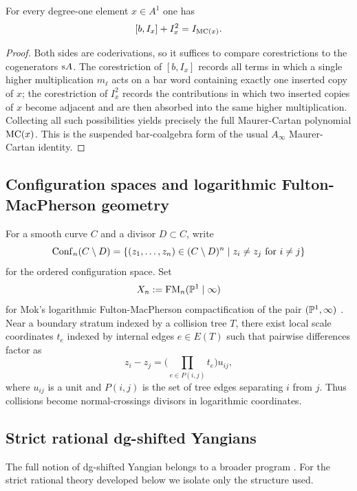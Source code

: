 \begin{lemma}%
For every degree-one element $x\in A^1$ one has
\[
 [b,I_x]+I_x^2 = I_{\mathrm{MC}(x)}.
\]
\end{lemma}

\begin{proof}
Both sides are coderivations, so it suffices to compare corestrictions to the cogenerators $\mathrm s A$. The corestriction of $[b,I_x]$ records all terms in which a single higher multiplication $m_\ell$ acts on a bar word containing exactly one inserted copy of $x$; the corestriction of $I_x^2$ records the contributions in which two inserted copies of $x$ become adjacent and are then absorbed into the same higher multiplication. Collecting all such possibilities yields precisely the full Maurer-Cartan polynomial $\mathrm{MC}(x)$. This is the suspended bar-coalgebra form of the usual $A_\infty$ Maurer-Cartan identity.
\end{proof}

\subsection{Configuration spaces and logarithmic Fulton-MacPherson geometry}
For a smooth curve $C$ and a divisor $D\subset C$, write
\[
 \mathrm{Conf}_n(C\setminus D)=\{(z_1,\dots,z_n)\in (C\setminus D)^n\mid z_i\neq z_j\text{ for }i\neq j\}
\]
for the ordered configuration space. Set
\[
 X_n:=\mathrm{FM}_n(\mathbb P^1\mid\infty)
\]
for Mok's logarithmic Fulton-MacPherson compactification of the pair $(\mathbb P^1,\infty)$ \cite{Mok25}. Near a boundary stratum indexed by a collision tree $T$, there exist local scale coordinates $t_e$ indexed by internal edges $e\in E(T)$ such that pairwise differences factor as
\[
 z_i-z_j = \Big(\prod_{e\in P(i,j)} t_e\Big)u_{ij},
\]
where $u_{ij}$ is a unit and $P(i,j)$ is the set of tree edges separating $i$ from $j$. Thus collisions become normal-crossings divisors in logarithmic coordinates.

\subsection{Strict rational dg-shifted Yangians}
The full notion of dg-shifted Yangian belongs to a broader program \cite{DNP25}. For the strict rational theory developed below we isolate only the structure used.

